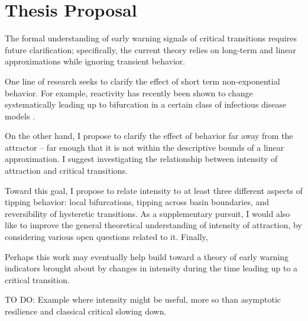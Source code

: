 \section{Thesis Proposal}
\label{sec:proposal}

The formal understanding of early warning signals of critical transitions requires future clarification; specifically, the current theory relies on long-term and linear approximations while ignoring transient behavior. 

One line of research seeks to clarify the effect of short term non-exponential behavior. For example, reactivity has recently been shown to change systematically leading up to bifurcation in a certain class of infectious disease models \cite{oreganTransientIndicatorsTipping2020}. 

On the other hand, I propose to clarify the effect of behavior far away from the attractor -- far enough that it is not within the descriptive bounds of a linear approximation. I suggest investigating the relationship between intensity of attraction and critical transitions. 

Toward this goal, I propose to relate intensity to at least three different aspects of tipping behavior: local bifurcations, tipping across basin boundaries, and reversibility of hysteretic transitions. As a supplementary pursuit, I would also like to improve the general theoretical understanding of intensity of attraction, by considering various open questions related to it. Finally, 



Perhaps this work may eventually help build toward a theory of early warning indicators brought about by changes in intensity during the time leading up to a critical transition. 


%

TO DO: Example where intensity might be useful, more so than asymptotic resilience and classical critical slowing down. 


